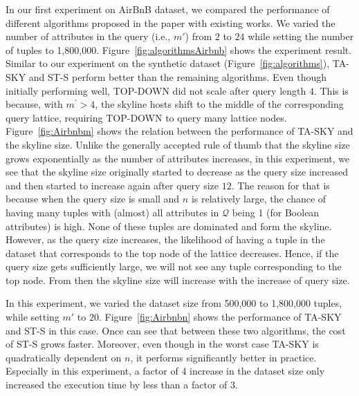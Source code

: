 \vspace{1mm}
 In our first experiment on AirBnB dataset, we compared the performance of different algorithms proposed in the paper with existing works.
We varied the number of attributes in the query (i.e., $m'$) from $2$ to $24$ while setting the number of tuples to 1,800,000.
Figure~\ref{fig:algorithmsAirbnb} shows the experiment result.
Similar to our experiment on the synthetic dataset (Figure~\ref{fig:algorithms}), TA-SKY and ST-S perform better than the remaining algorithms.
Even though initially performing well, TOP-DOWN did not scale after query length $4$. This is because, with $m^\prime > 4$, the skyline hosts shift to the middle of the corresponding query lattice, requiring TOP-DOWN to query many lattice nodes.
Figure~\ref{fig:Airbnbm} shows the relation between the performance of TA-SKY and the skyline size.
Unlike the generally accepted rule of thumb that the skyline size grows exponentially as the number of attributes increases, in this experiment, we see that the skyline size originally started to decrease as the query size increased and then started to increase again after query size $12$. The reason for that is because when the query size is small and $n$ is relatively large, the chance of having many tuples with (almost) all attributes in $\mathcal{Q}$ being 1 (for Boolean attributes) is high. None of these tuples are dominated and form the skyline. However, as the query size increases, the likelihood of having a tuple in the dataset that corresponds to the top node of the lattice decreases. Hence, if the query size gets sufficiently large, we will not see any tuple corresponding to the top node. From then the skyline size will increase with the increase of query size.


\vspace{1mm}
In this experiment, we varied the dataset size from 500,000 to 1,800,000 tuples, while setting $m'$ to $20$.
Figure~\ref{fig:Airbnbn} shows the performance of TA-SKY and ST-S in this case. Once can see that between these two algorithms, the cost of ST-S grows faster. Moreover, even though in the worst case TA-SKY is quadratically dependent on $n$, it performs significantly better in practice. Especially in this experiment, a factor of 4 increase in the dataset size only increased the execution time by less than a factor of 3.


